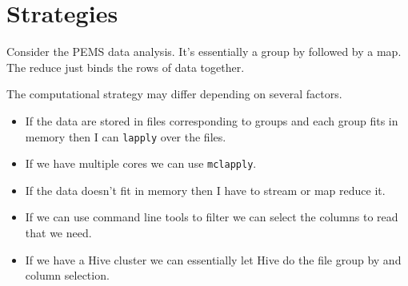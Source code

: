 \documentclass[12pt]{article}
\begin{document}
\section{Strategies}

Consider the PEMS data analysis. It's essentially a group by followed by a
map. The reduce just binds the rows of data together.

The computational strategy may differ depending on several factors.

\begin{itemize}
    \item If the data are stored in files corresponding to groups and each
        group fits in memory then I can \texttt{lapply} over the files.
    \item If we have multiple cores we can use \texttt{mclapply}.
    \item If the data doesn't fit in memory then I have to stream or map
        reduce it.
    \item If we can use command line tools to filter we can select the
        columns to read that we need.
    \item If we have a Hive cluster we can essentially let Hive do the file
        group by and column selection.
\end{itemize}
\end{document}
